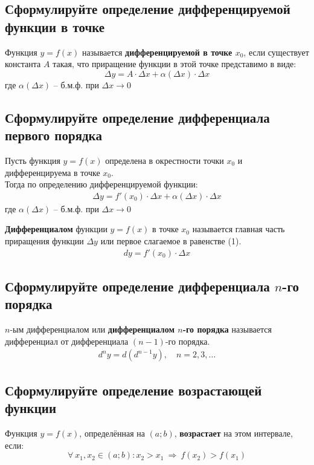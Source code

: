 \subsection{Сформулируйте определение дифференцируемой функции в точке}
\begin{definition}
	Функция $y=f(x)$ называется \textbf{дифференцируемой в точке $x_0$}, если существует константа $A$ такая, что приращение функции в этой точке представимо в виде: \[ \boxed{\Delta y = A\cdot \Delta x + \alpha (\Delta x) \cdot \Delta x} \]
	где $\alpha (\Delta x)$ -- б.м.ф. при $\Delta x \to 0$
\end{definition}
\newpage
\subsection{Сформулируйте определение дифференциала первого порядка}
Пусть функция $y=f(x)$ определена в окрестности точки $x_0$ и дифференцируема в точке $x_0$.\\
Тогда по определению дифференцируемой функции: \begin{align}
	\Delta y = f'(x_0) \cdot \Delta x + \alpha (\Delta x) \cdot \Delta x
\end{align}
где $\alpha (\Delta x)$ -- б.м.ф. при $\Delta x \to 0$
\begin{definition}
	\textbf{Дифференциалом} функции $y=f(x)$ в точке $x_0$ называется главная часть приращения функции $\Delta y$ или первое слагаемое в равенстве (1).
	\begin{align}
		\boxed{dy = f'(x_0) \cdot \Delta x}
	\end{align}
\end{definition}

\subsection{Сформулируйте определение дифференциала $n$-го порядка}
\begin{definition}
	$n$-ым дифференциалом или \textbf{дифференциалом $n$-го порядка} называется дифференциал от дифференциала $(n-1)$-го порядка.
	\begin{gather*}
		{d}^ny = d({d}^{n-1}y), \quad n=2,3,\ldots
	\end{gather*}
\end{definition}

\subsection{Сформулируйте определение возрастающей функции}
\begin{definition}
	Функция $y=f(x)$, определённая на $(a;b)$, \textbf{возрастает} на этом интервале, если: \[ \forall\ x_1, x_2 \in (a;b)\colon x_2 > x_1\ \Rightarrow\ f(x_2) > f(x_1) \]
\end{definition}

